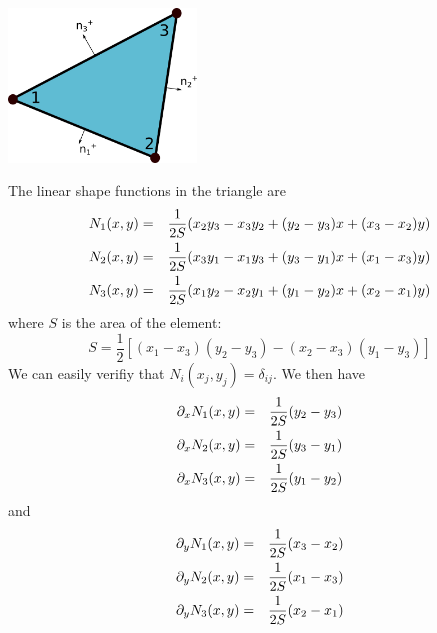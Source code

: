 
\begin{center}
\includegraphics[width=5cm]{images/dgfem/dgelts_p1}
\end{center}

The linear shape functions in the triangle are 
\begin{eqnarray}
N_1(x,y) &=& \frac{1}{2S} ( x_2y_3-x_3y_2+(y_2-y_3)x+(x_3-x_2)y   ) \nonumber\\
N_2(x,y) &=& \frac{1}{2S} ( x_3y_1-x_1y_3+(y_3-y_1)x+(x_1-x_3)y   ) \nonumber\\
N_3(x,y) &=& \frac{1}{2S} ( x_1y_2-x_2y_1+(y_1-y_2)x+(x_2-x_1)y   ) \nonumber
\end{eqnarray}
where $S$ is the area of the element:
\[
S= \frac{1}{2} [(x_1-x_3)(y_2-y_3)-(x_2-x_3)(y_1-y_3)]
\]
We can easily verifiy that $N_i(x_j,y_j)=\delta_{ij}$. We then have 
\begin{eqnarray}
\partial_x N_1(x,y) &=& \frac{1}{2S}  (y_2-y_3) \nonumber\\
\partial_x N_2(x,y) &=& \frac{1}{2S}  (y_3-y_1) \nonumber\\
\partial_x N_3(x,y) &=& \frac{1}{2S}  (y_1-y_2) \nonumber
\end{eqnarray}
and
\begin{eqnarray}
\partial_y N_1(x,y) &=& \frac{1}{2S}  (x_3-x_2) \nonumber\\
\partial_y N_2(x,y) &=& \frac{1}{2S}  (x_1-x_3) \nonumber\\
\partial_y N_3(x,y) &=& \frac{1}{2S}  (x_2-x_1) \nonumber
\end{eqnarray}

